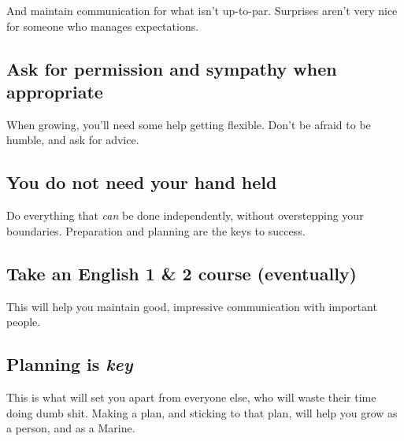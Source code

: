 And maintain communication for what isn't up-to-par. Surprises aren't very nice
for someone who manages expectations.

\subsection{Ask for permission and sympathy when appropriate}

When growing, you'll need some help getting flexible. Don't be afraid to be humble,
and ask for advice.

\subsection{You do not need your hand held}

Do everything that \textit{can} be done independently, without overstepping your
boundaries. Preparation and planning are the keys to success.

\subsection{Take an English 1 \& 2 course (eventually)}

This will help you maintain good, impressive communication with important people.

\subsection{Planning is \textit{key}}

This is what will set you apart from everyone else, who will waste their time
doing dumb shit. Making a plan, and sticking to that plan, will help you grow
as a person, and as a Marine.
